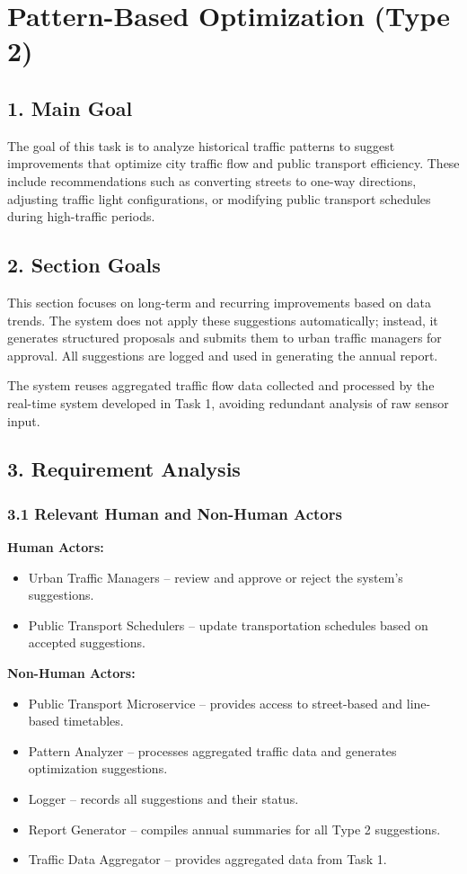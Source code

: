 \section{Pattern-Based Optimization (Type 2)}

\subsection*{1. Main Goal}

The goal of this task is to analyze historical traffic patterns to suggest improvements that optimize city traffic flow and public transport efficiency. These include recommendations such as converting streets to one-way directions, adjusting traffic light configurations, or modifying public transport schedules during high-traffic periods.

\subsection*{2. Section Goals}

This section focuses on long-term and recurring improvements based on data trends. The system does not apply these suggestions automatically; instead, it generates structured proposals and submits them to urban traffic managers for approval. All suggestions are logged and used in generating the annual report.

The system reuses aggregated traffic flow data collected and processed by the real-time system developed in Task 1, avoiding redundant analysis of raw sensor input.

\subsection*{3. Requirement Analysis}

\subsubsection*{3.1 Relevant Human and Non-Human Actors}

\textbf{Human Actors:}
\begin{itemize}
    \item Urban Traffic Managers – review and approve or reject the system's suggestions.
    \item Public Transport Schedulers – update transportation schedules based on accepted suggestions.
\end{itemize}

\textbf{Non-Human Actors:}
\begin{itemize}
    \item Public Transport Microservice – provides access to street-based and line-based timetables.
    \item Pattern Analyzer – processes aggregated traffic data and generates optimization suggestions.
    \item Logger – records all suggestions and their status.
    \item Report Generator – compiles annual summaries for all Type 2 suggestions.
    \item Traffic Data Aggregator – provides aggregated data from Task 1.
\end{itemize}

